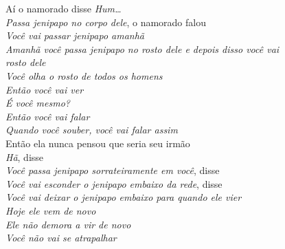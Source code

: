 \begin{linenumbers}
\noindent Aí o namorado disse \textit{Hum\ldots{}}\\
\textit{Passa jenipapo no corpo dele}, o namorado falou\\
\textit{Você vai passar jenipapo amanhã}\\
\textit{Amanhã você passa jenipapo no rosto dele e depois disso você vai\\
rosto dele}\\
\textit{Você olha o rosto de todos os homens}\\
\textit{Então você vai ver}\\
\textit{É você mesmo?}\\
\textit{Então você vai falar}\\
\textit{Quando você souber, você vai falar assim}\\
Então ela nunca pensou que seria seu irmão\\
\textit{Hã}, disse\\
\textit{Você passa jenipapo sorrateiramente em você}, disse\\
\textit{Você vai esconder o jenipapo embaixo da rede}, disse\\
\textit{Você vai deixar o jenipapo embaixo para quando ele vier}\\
\textit{Hoje ele vem de novo}\\
\textit{Ele não demora a vir de novo}\\
\textit{Você não vai se atrapalhar}
\end{linenumbers}

